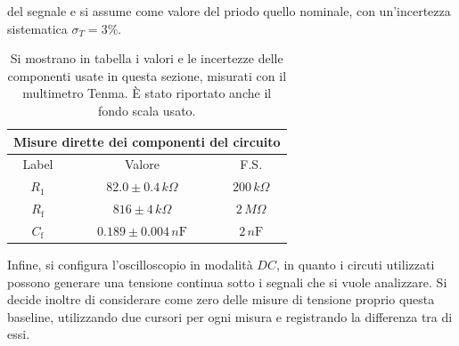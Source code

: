 del segnale e si assume come valore del priodo quello nominale, con un'incertezza
sistematica  $\sigma_{T}=3\%$.%
\renewcommand{\arraystretch}{1.1}
\begin{table}
\centering
\setlength{\tabcolsep}{10pt}
\begin{tabular}{ |c|c|c|  }
\hline
\multicolumn{3}{|c|}{Misure dirette dei componenti del circuito} \\
\hline
Label      & Valore & F.S.\\
\hline
$R_{1}$ & $82.0 \pm 0.4\,\si{k\Omega}$ &$200\,\si{k\Omega}$ \\
$R_{\text{f}}$ & $816 \pm 4\,\si{k\Omega}$ &$2\,\si{M\Omega}$ \\
$C_{\text{f}}$ & $0.189 \pm 0.004\,\si{n\farad}$ &$2\,\si{n\farad}$ \\
\hline
\end{tabular}
\caption{\footnotesize Si mostrano in tabella i valori e le incertezze delle componenti usate
  in questa sezione, misurati con il multimetro Tenma. È stato riportato anche il fondo scala
  usato.}\label{tab:preamp_misure}
\end{table}
\noindent Infine, si configura l'oscilloscopio
in modalità $DC$, in quanto i circuti utilizzati possono generare una tensione
continua sotto i segnali che si vuole analizzare. Si decide inoltre di
considerare come zero delle misure di tensione proprio questa baseline,
utilizzando due cursori per ogni misura e registrando la differenza tra di essi.
\\

